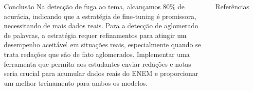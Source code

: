 \documentclass[
  xcolor={hyperref,svgnames,x11names,table},
  hyperref={pdfencoding=unicode,plainpages=false,pdfpagelabels=true,breaklinks=true},
  brazilian, english
]{beamer}
\begin{document}
\begin{frame}[fragile]
\begin{columns}[T]
\begin{block}{Conclusão}
Na detecção de fuga ao tema, alcançamos 80\% de acurácia, indicando que a estratégia de fine-tuning é promissora, necessitando de mais dados reais. Para a detecção de aglomerado de palavras, a estratégia requer refinamentos para atingir um desempenho aceitável em situações reais, especialmente quando se trata redações que são de fato aglomerados. Implementar uma ferramenta que permita aos estudantes enviar redações e notas seria crucial para acumular dados reais do ENEM e proporcionar um melhor treinamento para ambos os modelos.

  
  \end{block}

    \begin{block}{Referências}
    \justifying
        \printbibliography
    \end{block}

\end{columns}

\end{frame}
\end{document}
